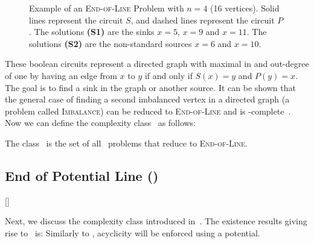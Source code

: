 
\begin{figure}[ht]
	\centering
	\caption[Example of an \textsc{End-of-Line} Problem]{Example of an \textsc{End-of-Line} Problem with $n=4$ (16 vertices). Solid lines represent the circuit $S$, and dashed lines represent the circuit $P$. The solutions \textbf{(S1)} are the sinks $x=5$, $x=9$ and $x=11$. The solutions \textbf{(S2)} are the non-standard sources $x=6$ and $x=10$.}\label{fig:ppad_example}
\end{figure}

These boolean circuits represent a directed graph with maximal in and out-degree of one by having an edge from $x$ to $y$ if and only if $S(x) = y$ and $P(y) =
	x$.
The goal is to find a sink in the graph or another source.
It can be shown that the general case of finding a second imbalanced vertex in a directed graph (a problem called \textsc{Imbalance}) can be reduced to \textsc{End-of-Line} and is \PPAD-complete~. Now we can define the complexity class \PPAD\ as follows:

\begin{definition}[\PPAD]
	The class \PPAD\ is the set of all \TFNP\ problems that reduce to \textsc{End-of-Line}.
\end{definition}

\subsection{End of Potential Line (\EOPL)}[\EOPL]

Next, we discuss the complexity class \EOPL{} introduced in~. The existence results giving rise to \EOPL\ is:
Similarly to \PLS, acyclicity will be enforced using a potential.

